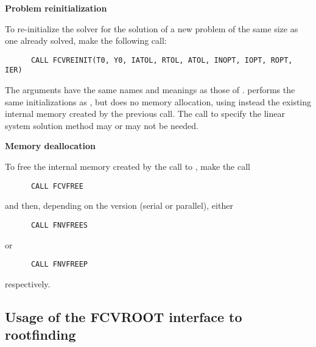 \begin{Steps}
\item {\bf Problem reinitialization}

  To re-initialize the {\cvode} solver for the solution of a new problem
  of the same size as one already solved, make the following call:
\begin{verbatim}
      CALL FCVREINIT(T0, Y0, IATOL, RTOL, ATOL, INOPT, IOPT, ROPT, IER)
\end{verbatim}
  The arguments have the same names and meanings as those of .
   performs the same initializations as
  , but does no memory allocation, using instead the existing
  internal memory created by the previous  call.  The call to
  specify the linear system solution method may or may not be needed.

\item {\bf Memory deallocation}

  To free the internal memory created by the call to ,
  make the call
\begin{verbatim}
      CALL FCVFREE
\end{verbatim}
  and then, depending on the {\nvector} version (serial or parallel), either
\begin{verbatim}
      CALL FNVFREES
\end{verbatim}
  or
\begin{verbatim}
      CALL FNVFREEP  
\end{verbatim}
  respectively.

\end{Steps}

\subsection{Usage of the FCVROOT interface to rootfinding}

